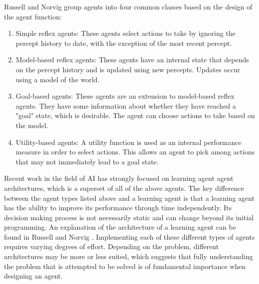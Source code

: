 Russell and Norvig group agents into four common classes based on the design of the agent function\cite[p.~47]{AIAMA}: 
\begin{enumerate}
    \item Simple reflex agents: These agents select actions to take by ignoring the percept history to date, with the exception of the most recent percept.
    \item Model-based reflex agents: These agents have an internal state that depends on the percept history and is updated using new percepts. Updates occur using a model of the world.
    \item Goal-based agents: These agents are an extension to model-based reflex agents. They have some information about whether they have reached a "goal" state, which is desirable. The agent can choose actions to take based on the model.
    \item Utility-based agents: A utility function is used as an internal performance measure in order to select actions. This allows an agent to pick among actions that may not immediately lead to a goal state.
\end{enumerate}
Recent work in the field of AI has strongly focused on learning agent agent architectures, which is a superset of all of the above agents. The key difference between the agent types listed above and a learning agent is that a learning agent has the ability to improve its performance through time independently. Its decision making process is not necessarily static and can change beyond its initial programming. An explanation of the architecture of a learning agent can be found in Russell and Norvig \cite[p.~55]{AIAMA}. Implementing each of these different types of agents requires varying degrees of effort. Depending on the problem, different architectures may be more or less suited, which suggests that fully understanding the problem that is attempted to be solved is of fundamental importance when designing an agent.





